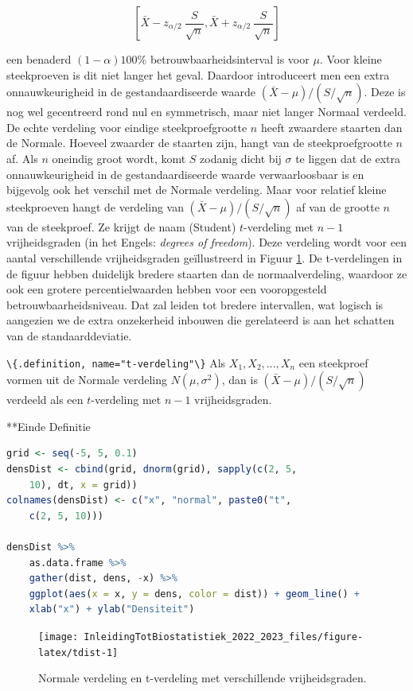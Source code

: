 \documentclass[
  12pt,dutch,coursenotes]{book}
\newcommand{\passthrough}[1]{#1}
\begin{document}
\[
\left[\bar{X} - z_{\alpha/2} \ \frac{S}{\sqrt{n}} , \bar{X} + z_{\alpha/2} \
\frac{S}{\sqrt{n}}\right]
\]

een benaderd \((1- \alpha)100\%\) betrouwbaarheidsinterval is voor \(\mu\). Voor
kleine steekproeven is dit niet langer het geval. Daardoor introduceert men
een extra onnauwkeurigheid in de gestandaardiseerde waarde \({(\bar{X} - \mu)}/{(S/\sqrt{n})}\). Deze is nog wel gecentreerd rond nul en symmetrisch, maar niet langer Normaal verdeeld. De echte verdeling voor eindige
steekproefgrootte \(n\) heeft zwaardere staarten dan de Normale. Hoeveel
zwaarder de staarten zijn, hangt van de steekproefgrootte \(n\) af. Als \(n\)
oneindig groot wordt, komt \(S\) zodanig dicht bij \(\sigma\) te liggen dat de
extra onnauwkeurigheid in de gestandaardiseerde waarde verwaarloosbaar is en
bijgevolg ook het verschil met de Normale verdeling. Maar voor relatief
kleine steekproeven hangt de verdeling van \({(\bar{X} - \mu)}/({S/\sqrt{n}})\) af van de grootte \(n\) van de steekproef. Ze krijgt de naam (Student) \(t\)-verdeling met \(n-1\) vrijheidsgraden (in het Engels: \emph{degrees of freedom}). Deze verdeling wordt voor een aantal verschillende vrijheidsgraden geïllustreerd in Figuur \ref{fig:tdist}.
De t-verdelingen in de figuur hebben duidelijk bredere staarten dan de normaalverdeling, waardoor ze ook een grotere percentielwaarden hebben voor een vooropgesteld betrouwbaarheidsniveau.
Dat zal leiden tot bredere intervallen, wat logisch is aangezien we de extra onzekerheid inbouwen die gerelateerd is aan het schatten van de standaarddeviatie.

\passthrough{\lstinline!\{.definition, name="t-verdeling"\}!}
Als \(X_1, X_2, ..., X_n\) een steekproef vormen uit de Normale verdeling \(N(\mu, \sigma^2)\), dan is \((\bar{X} - \mu)/(S/\sqrt{n})\) verdeeld als een \(t\)-verdeling met \(n-1\) vrijheidsgraden.

**Einde Definitie

\begin{lstlisting}[language=R]
grid <- seq(-5, 5, 0.1)
densDist <- cbind(grid, dnorm(grid), sapply(c(2, 5,
    10), dt, x = grid))
colnames(densDist) <- c("x", "normal", paste0("t",
    c(2, 5, 10)))

densDist %>%
    as.data.frame %>%
    gather(dist, dens, -x) %>%
    ggplot(aes(x = x, y = dens, color = dist)) + geom_line() +
    xlab("x") + ylab("Densiteit")
\end{lstlisting}

\begin{figure}

{\centering \texttt{[image: InleidingTotBiostatistiek\_2022\_2023\_files/figure-latex/tdist-1]} 

}

\caption{Normale verdeling en t-verdeling met verschillende vrijheidsgraden.}\label{fig:tdist}
\end{figure}
\end{document}
